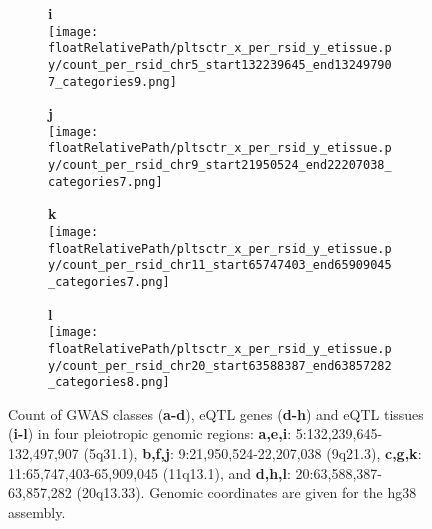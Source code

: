 \begin{figure}[!tbp]
\begin{subfigure}[]{.24\textwidth}
\textbf{i}
\\
\texttt{[image: \\floatRelativePath/pltsctr\_x\_per\_rsid\_y\_etissue.py/count\_per\_rsid\_chr5\_start132239645\_end132497907\_categories9.png]}
\end{subfigure}
%
\begin{subfigure}[]{.24\textwidth}
\textbf{j}
\\
\texttt{[image: \\floatRelativePath/pltsctr\_x\_per\_rsid\_y\_etissue.py/count\_per\_rsid\_chr9\_start21950524\_end22207038\_categories7.png]}
\end{subfigure}
%
\begin{subfigure}[]{.24\textwidth}
\textbf{k}
\\
\texttt{[image: \\floatRelativePath/pltsctr\_x\_per\_rsid\_y\_etissue.py/count\_per\_rsid\_chr11\_start65747403\_end65909045\_categories7.png]}
\end{subfigure}
%
\begin{subfigure}[]{.24\textwidth}
\textbf{l}
\\
\texttt{[image: \\floatRelativePath/pltsctr\_x\_per\_rsid\_y\_etissue.py/count\_per\_rsid\_chr20\_start63588387\_end63857282\_categories8.png]}
\end{subfigure}

\caption{Count of GWAS classes (\textbf{a-d}), eQTL genes (\textbf{d-h}) and eQTL tissues (\textbf{i-l}) in four
pleiotropic genomic regions: \textbf{a,e,i}: 5:132,239,645-132,497,907 (5q31.1), \textbf{b,f,j}: 9:21,950,524-22,207,038 (9q21.3),
    \textbf{c,g,k}: 11:65,747,403-65,909,045 (11q13.1), and \textbf{d,h,l}: 20:63,588,387-63,857,282 (20q13.33).
    Genomic coordinates are given for the hg38 assembly.}
\label{fig:region_gwas_egenes_tissues}
%
\end{figure}


%
%

